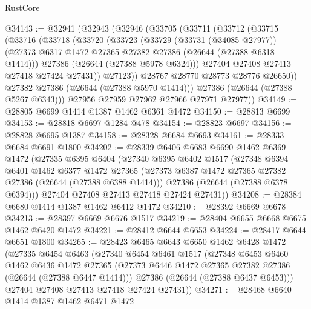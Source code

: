 \begin{lexlean}{RustCore}
\begin{coremodule}
@34143 := @32941
    (@32943
      (@32946
        (@33705
          (@33711
            (@33712
              (@33715
                (@33716
                  (@33718
                    (@33720
                      (@33723
                        (@33729
                          (@33731 (@34085 @27977))
                          (@27373 @6317 @1472 @27365 @27382 @27386 (@26644 (@27388 @6318 @1414)))
                          @27386
                          (@26644 (@27388 @5978 @6324)))
                        @27404
                        @27408
                        @27413
                        @27418
                        @27424
                        @27431))
                    @27123))
                @28767
                @28770
                @28773
                @28776
                @26650))
            @27382
            @27386
            (@26644 (@27388 @5970 @1414)))
          @27386
          (@26644 (@27388 @5267 @6343)))
        @27956
        @27959
        @27962
        @27966
        @27971
        @27977))
@34149 := @28805 @6699 @1414 @1387 @1462 @6361 @1472
@34150 := @28813 @6699
@34153 := @28818 @6697 @1284 @478
@34154 := @28823 @6697
@34156 := @28828 @6695 @1387
@34158 := @28328 @6684 @6693
@34161 := @28333 @6684 @6691 @1800
@34202 := @28339
    @6406
    @6683
    @6690
    @1462
    @6369
    @1472
    (@27335
      @6395
      @6404
      (@27340
        @6395
        @6402
        @1517
        (@27348
          @6394
          @6401
          @1462
          @6377
          @1472
          @27365
          (@27373 @6387 @1472 @27365 @27382 @27386 (@26644 (@27388 @6388 @1414)))
          @27386
          (@26644 (@27388 @6378 @6394)))
        @27404
        @27408
        @27413
        @27418
        @27424
        @27431))
@34208 := @28384 @6680 @1414 @1387 @1462 @6412 @1472
@34210 := @28392 @6669 @6678
@34213 := @28397 @6669 @6676 @1517
@34219 := @28404 @6655 @6668 @6675 @1462 @6420 @1472
@34221 := @28412 @6644 @6653
@34224 := @28417 @6644 @6651 @1800
@34265 := @28423
    @6465
    @6643
    @6650
    @1462
    @6428
    @1472
    (@27335
      @6454
      @6463
      (@27340
        @6454
        @6461
        @1517
        (@27348
          @6453
          @6460
          @1462
          @6436
          @1472
          @27365
          (@27373 @6446 @1472 @27365 @27382 @27386 (@26644 (@27388 @6447 @1414)))
          @27386
          (@26644 (@27388 @6437 @6453)))
        @27404
        @27408
        @27413
        @27418
        @27424
        @27431))
@34271 := @28468 @6640 @1414 @1387 @1462 @6471 @1472

\end{coremodule}
\end{lexlean}
